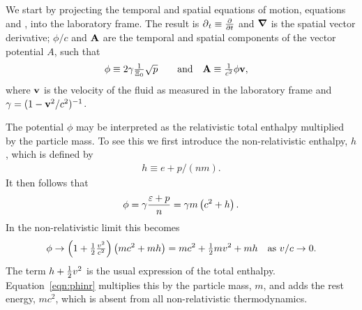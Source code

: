 We start  by projecting the temporal and spatial equations of motion, equations  and ,
into the laboratory frame.
The result is
$\operatorname{\partial}_t \equiv \frac{\partial }{\partial t}$ and $\mbox{\boldmath $\nabla$}$ is the spatial vector derivative;
$\phi / c$ and $\textbf{A}$ are the temporal and spatial components of the vector potential $A$, such that
\begin{align}
\phi &\equiv  2\gamma \tfrac{1}{\scalefactor }\sqrt {p}   %
& \quad\text{and} &&
\vA &\equiv \tfrac{1}{c^2} \phi \vv,  %
 \end{align}
where $\textbf{v}$ is the velocity  of the fluid as measured in the laboratory frame and 
 $\gamma = (1-\textbf{v}^2/c^2)^{-1}$. %

The potential $\phi$ may be  interpreted as the relativistic  total enthalpy multiplied by the particle mass.
To see this we first introduce the non-relativistic enthalpy, $h$, which is defined by
\begin{align}
  h \equiv e + p/(nm).
\end{align}
It then follows that 
\begin{align}
  \phi  =   \gamma\frac{\varepsilon + p }{n} = \gamma m\left( c^2 + h \right).
\end{align}
In the  non-relativistic limit this becomes
\begin{align}
  \phi \rightarrow \left( 1+\tfrac{1}{2}\tfrac{v^2}{c^2} \right) \left( mc^2 + mh \right) = mc^2 + \tfrac{1}{2}m v^2 + mh \text{\quad as ${v/c\rightarrow 0.}$}
  \label{eqn:phinr}
\end{align}
The term $h + \tfrac{1}{2} v^2$ is the usual expression of the total enthalpy.
Equation~\ref{eqn:phinr} multiplies this by the particle mass, $m$, and adds the rest energy, $mc^2$, 
which is absent from all non-relativistic thermodynamics.




